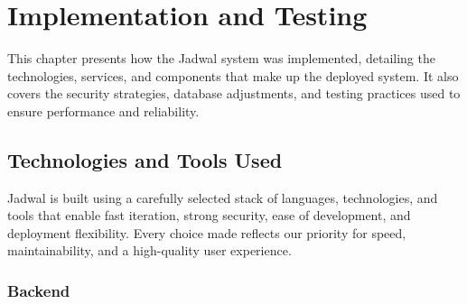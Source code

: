 \chapter{Implementation and Testing}

This chapter presents how the Jadwal system was implemented, detailing the technologies, services, and components that make up the deployed system. It also covers the security strategies, database adjustments, and testing practices used to ensure performance and reliability.

\section{Technologies and Tools Used}

Jadwal is built using a carefully selected stack of languages, technologies, and tools that enable fast iteration, strong security, ease of development, and deployment flexibility. Every choice made reflects our priority for speed, maintainability, and a high-quality user experience.

\subsection{Backend}

